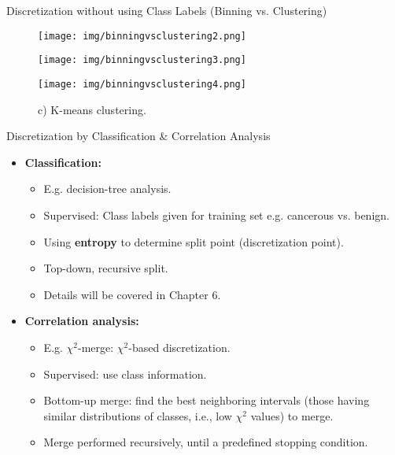 \begin{frame}{Discretization without using Class Labels (Binning vs.
		Clustering)}
	\begin{figure}[H]
		\centering
		\begin{minipage}{0.32\textwidth}
			\texttt{[image: img/binningvsclustering2.png]}
			\caption{a) Equal interval width (binning).}
		\end{minipage}
		\begin{minipage}{0.32\textwidth}
			\centering
			\texttt{[image: img/binningvsclustering3.png]}
			\caption{b) Equal frequency (binning).}
		\end{minipage}
		\begin{minipage}{0.32\textwidth}
			\centering
			\texttt{[image: img/binningvsclustering4.png]}
			\caption{c) K-means clustering.}
		\end{minipage}\hfill
	\end{figure}
\end{frame}

\begin{frame}{Discretization by Classification \& Correlation Analysis}
	\begin{itemize}
		\item \textbf{Classification:}
		      \begin{itemize}
			      \item E.g. decision-tree analysis.
			      \item Supervised: Class labels given for training set e.g.
			            cancerous vs. benign.
			      \item Using \textbf{entropy} to determine split point
			            (discretization point).
			      \item Top-down, recursive split.
			      \item Details will be covered in Chapter 6.
		      \end{itemize}
		\item \textbf{Correlation analysis:}
		      \begin{itemize}
			      \item E.g. $\chi^2$-merge: $\chi^2$-based discretization.
			      \item Supervised: use class information.
			      \item Bottom-up merge: find the best neighboring intervals (those
			            having similar distributions of classes, i.e., low $\chi^2$ values)
			            to merge.
			      \item Merge performed recursively, until a predefined stopping
			            condition.
		      \end{itemize}
	\end{itemize}
\end{frame}


